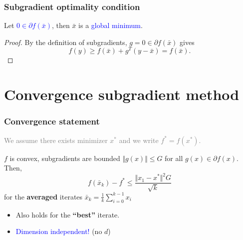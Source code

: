 \documentclass{beamer}
\begin{document}
\begin{frame}
  \frametitle{Subgradient optimality condition}
  \begin{lemma}%
    Let \textcolor{blue}{$0 \in \partial f(\bar{x})$}, then $\bar{x}$ is a \textcolor{blue}{global minimum}.
  \end{lemma}
  \begin{proof}
    By the definition of subgradients, $g=0 \in \partial f(\bar{x})$ gives
    \begin{equation}
      f(y) \ge f(\bar{x}) + g^T(y-\bar{x}) = f(\bar{x}).
    \end{equation}
  \end{proof}
\end{frame}


\section{Convergence subgradient method}%
\label{sec:}

\begin{frame}
  \frametitle{Convergence statement}
  \textcolor{gray}{We assume there exists minimizer $x^*$ and we write $f^*=f(x^*)$.}
  \begin{theorem}
    $f$ is convex, subgradients are bounded $\Vert g(x) \Vert \le G$ for all $g(x)\in \partial f(x)$. Then,
    \begin{equation}
      f(\bar{x}_k) - f^* \le \frac{\Vert x_1-x^*\Vert^2 G}{\sqrt{k}}
    \end{equation}
    for the \textbf{averaged} iterates $\bar{x}_k = \frac{1}{k} \sum_{i=0}^{k-1} x_i $
  \end{theorem}
  \begin{itemize}
    \item Also holds for the \textbf{``best''} iterate.
    \item \textcolor{blue}{Dimension independent!} (no $d$)
  \end{itemize}
\end{frame}
\end{document}
